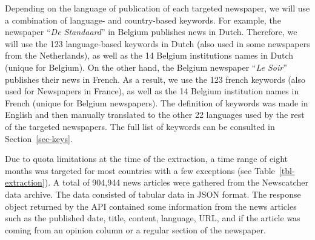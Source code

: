 \documentclass[
]{agujournal2019}
\begin{document}
Depending on the language of publication of each targeted newspaper, we
will use a combination of language- and country-based keywords. For
example, the newspaper ``\emph{De Standaard}'' in Belgium publishes news
in Dutch. Therefore, we will use the 123 language-based keywords in
Dutch (also used in some newspapers from the Netherlands), as well as
the 14 Belgium institutions names in Dutch (unique for Belgium). On the
other hand, the Belgium newspaper ``\emph{Le Soir}'' publishes their
news in French. As a result, we use the 123 french keywords (also used
for Newspapers in France), as well as the 14 Belgium institution names
in French (unique for Belgium newspapers). The definition of keywords
was made in English and then manually translated to the other 22
languages used by the rest of the targeted newspapers.
The full list of keywords can be consulted in Section~\ref{sec-keys}.

Due to quota limitations at the time of the extraction, a
time range of eight months was targeted for most countries with a few
exceptions (see Table~\ref{tbl-extraction}). A total of 904,944 news
articles were gathered from the Newscatcher data archive. The data
consisted of tabular data in JSON format. The response object returned
by the API contained some information from the news articles such as the
published date, title, content, language, URL, and if the article was
coming from an opinion column or a regular section of the newspaper.
\end{document}
